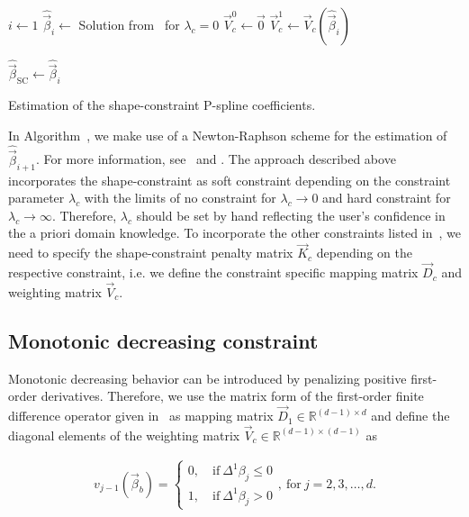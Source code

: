 \begin{algorithm}[H]
	\SetAlgoLined
	$ i \gets 1$\;
	$\hat{\vec{\beta}}_{i} \gets$ Solution from~ for $\lambda_c = 0$\;
	$\vec{V}^0_c \gets \vec{0}$\;
	$\vec{V}^1_c \gets \vec{V}_c(\hat{\vec{\beta}}_{i})$\;

	$\hat{\vec{\beta}}_{\mathrm{SC}} \gets \hat{\vec{\beta}}_{i}$\;
	\caption{Estimation of the shape-constraint P-spline coefficients.}
	\label{alg:scp}
\end{algorithm}
%
In Algorithm~, we make use of a Newton-Raphson scheme for the estimation of $\hat{\vec{\beta}}_{i+1}$. For more information, see~ and \cite{bollaerts2006simple}. The approach described above incorporates the shape-constraint as soft constraint depending on the constraint parameter $\lambda_c$ with the limits of no constraint for $\lambda_c \rightarrow 0$ and hard constraint for $\lambda_c \rightarrow \infty$. Therefore, $\lambda_c$ should be set by hand reflecting the user's confidence in  the a priori domain knowledge. To incorporate the other constraints listed in~, we need to specify the shape-constraint  penalty matrix $\vec{K}_c$ depending on the respective constraint, i.e. we define the constraint specific mapping matrix $\vec{D}_c$ and weighting matrix $\vec{V}_c$. 

\subsection{Monotonic decreasing constraint} \label{subsec:MDC}

Monotonic decreasing behavior can be introduced by penalizing positive first-order derivatives. Therefore, we use the matrix form of the first-order finite difference operator given in~ as mapping matrix $\vec{D}_1 \in \mathbb{R}^{(d-1) \times d}$ and define the diagonal elements of the weighting matrix $\vec{V}_c \in \mathbb{R}^{(d-1) \times (d-1)}$ as

\begin{align} \label{eq:weighting-matrix-dec-diagonal}
	v_{j-1}(\vec{\beta}_b) = \begin{cases}
		0, \quad \text{if} \ \Delta^1\beta_j \le 0 \\ 
		1, \quad \text{if} \ \Delta^1\beta_j > 0
	\end{cases},	\ \text{for} \ j=2,3, \dots, d.
\end{align}


